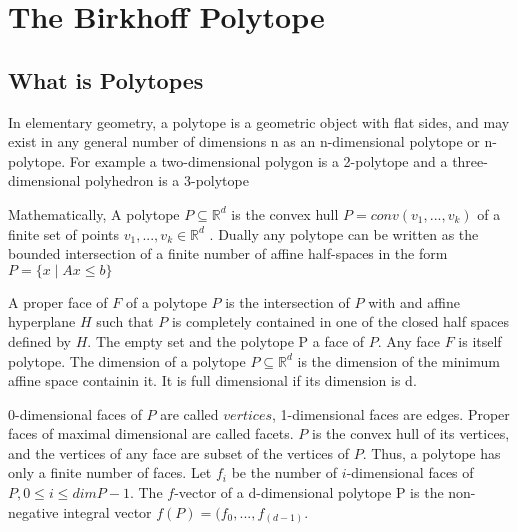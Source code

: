
\chapter{The Birkhoff Polytope} %

\label{ChapterX} %




\section{What is Polytopes}

In elementary geometry, a polytope is a geometric object with flat sides, and may exist in any general number of dimensions n as an n-dimensional polytope or n-polytope. For example a two-dimensional polygon is a 2-polytope and a three-dimensional polyhedron is a 3-polytope

Mathematically, A polytope $P\subseteq \mathbb{R}^d$ is the convex hull $P=conv(v_1,...,v_k)$ of a finite set of points $v_1,...,v_k \in \mathbb{R}^d$ . Dually any polytope can be written as the bounded intersection of a finite number of affine half-spaces in the form $P = \{ x\mid Ax \leq b \}$

A proper face of $F$ of a polytope $P$ is the intersection of $P$ with and affine hyperplane $H$ such that $P$ is completely contained in one of the closed half spaces defined by $H$. The empty set and the polytope P a face of $P$. Any face $F$ is itself  polytope. The dimension of a polytope $P \subseteq \mathbb{R}^d$ is the dimension of the minimum affine space containin it. It is full dimensional if its dimension is d.

0-dimensional faces of $P$ are called $vertices$, 1-dimensional faces are edges. Proper faces of maximal dimensional are called facets. $P$ is the convex hull of its vertices, and the vertices of any face are subset of the vertices of $P$. Thus, a polytope has only a finite number of faces. Let $f_i$ be the number of $i$-dimensional faces of $P,0 \leq i \leq dim P-1$. The $f$-vector of a d-dimensional polytope P is the non-negative integral vector $f(P) = (f_0,...,f_(d-1)$.

